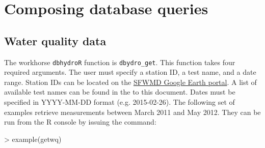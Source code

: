 \documentclass[12pt,notitlepage]{article}
\begin{document}
\section{Composing database queries}
\subsection{Water quality data}

The workhorse \texttt{dbhydroR} function is \verb|dbydro_get|. This function takes four required arguments. The user must specify a station ID, a test name, and a date range. Station IDs can be located on the \href{http://my.sfwmd.gov/KMLEXT/CUSTOMKMLS/DBHydro/DBHydroKML/DBHYDRO_KML.kmz}{SFWMD Google Earth portal}. A list of available test names can be found in the  to this document. Dates must be specified in YYYY-MM-DD format (e.g. 2015-02-26).   The following set of examples retrieve measurements between March 2011 and May 2012. They can be run from the R console by issuing the command:

\begin{Schunk}
\begin{Sinput}
> example(getwq)
\end{Sinput}
\end{Schunk}
\end{document}
